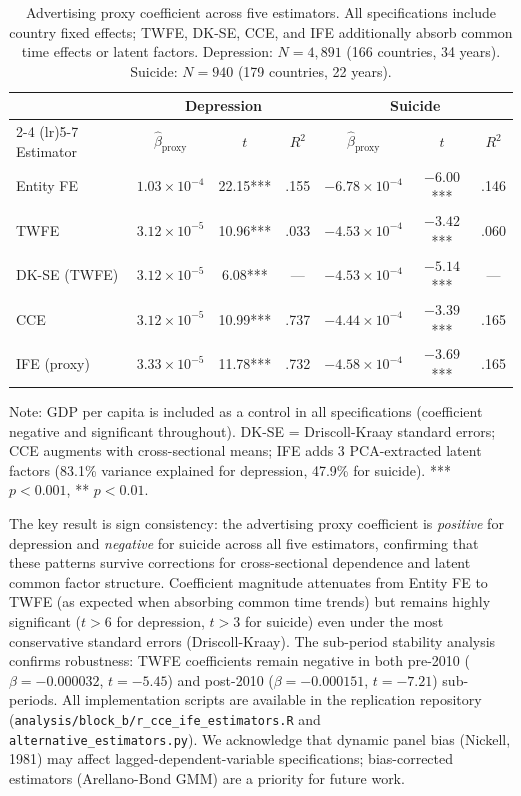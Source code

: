 \documentclass[a4paper,11pt,titlepage]{article}
\begin{document}
\begin{table}[htbp]
\centering
\caption{Advertising proxy coefficient across five estimators. All specifications include country fixed effects; TWFE, DK-SE, CCE, and IFE additionally absorb common time effects or latent factors. Depression: $N = 4{,}891$ (166 countries, 34 years). Suicide: $N = 940$ (179 countries, 22 years).}
\label{tab:cce-ife}
\small
\begin{tabular}{lcccccc}
\hline
& \multicolumn{3}{c}{\textbf{Depression}} & \multicolumn{3}{c}{\textbf{Suicide}} \\
\cmidrule(lr){2-4} \cmidrule(lr){5-7}
Estimator & $\hat{\beta}_{\text{proxy}}$ & $t$ & $R^2$ & $\hat{\beta}_{\text{proxy}}$ & $t$ & $R^2$ \\
\hline
Entity FE     & $1.03 \times 10^{-4}$ & 22.15*** & .155 & $-6.78 \times 10^{-4}$ & $-6.00$*** & .146 \\
TWFE          & $3.12 \times 10^{-5}$ & 10.96*** & .033 & $-4.53 \times 10^{-4}$ & $-3.42$*** & .060 \\
DK-SE (TWFE)  & $3.12 \times 10^{-5}$ &  6.08*** &  —  & $-4.53 \times 10^{-4}$ & $-5.14$*** &  —  \\
CCE           & $3.12 \times 10^{-5}$ & 10.99*** & .737 & $-4.44 \times 10^{-4}$ & $-3.39$*** & .165 \\
IFE (proxy)   & $3.33 \times 10^{-5}$ & 11.78*** & .732 & $-4.58 \times 10^{-4}$ & $-3.69$*** & .165 \\
\hline
\end{tabular}
\par\smallskip
\footnotesize{Note: GDP per capita is included as a control in all specifications (coefficient negative and significant throughout). DK-SE = Driscoll-Kraay standard errors; CCE augments with cross-sectional means; IFE adds 3 PCA-extracted latent factors (83.1\% variance explained for depression, 47.9\% for suicide). *** $p < 0.001$, ** $p < 0.01$.}
\end{table}

The key result is sign consistency: the advertising proxy coefficient is \emph{positive} for depression and \emph{negative} for suicide across all five estimators, confirming that these patterns survive corrections for cross-sectional dependence and latent common factor structure. Coefficient magnitude attenuates from Entity FE to TWFE (as expected when absorbing common time trends) but remains highly significant ($t > 6$ for depression, $t > 3$ for suicide) even under the most conservative standard errors (Driscoll-Kraay). The sub-period stability analysis confirms robustness: TWFE coefficients remain negative in both pre-2010 ($\beta = -0.000032$, $t = -5.45$) and post-2010 ($\beta = -0.000151$, $t = -7.21$) sub-periods. All implementation scripts are available in the replication repository (\texttt{analysis/block\_b/r\_cce\_ife\_estimators.R} and \texttt{alternative\_estimators.py}). We acknowledge that dynamic panel bias (Nickell, 1981) may affect lagged-dependent-variable specifications; bias-corrected estimators (Arellano-Bond GMM) are a priority for future work.
\end{document}
